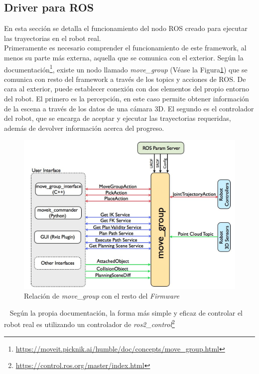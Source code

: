 \subsection{Driver para ROS}
\noindent En esta sección se detalla el funcionamiento del nodo ROS creado para ejecutar las trayectorias en el robot real.
\\


Primeramente es necesario comprender el funcionamiento de este framework, al menos su parte más externa, aquella que 
se comunica con el exterior. 
Según la documentación\footnote{\url{https://moveit.picknik.ai/humble/doc/concepts/move_group.html}}, existe 
un nodo llamado \textit{move\_group} (Véase la Figura\ref{fig:arquitectura_moveit}) que se comunica con resto del framework 
a través de los topics y acciones de ROS. De cara al exterior, puede establecer conexión con dos elementos del propio entorno del robot. 
El primero es la percepción, en este caso permite obtener información de la escena a través de los datos de una cámara 3D. El segundo es el 
controlador del robot, que se encarga de aceptar y ejecutar las trayectorias requeridas, además de devolver información acerca del 
progreso.
\begin{figure} [ht!]
    \begin{center}
      \includegraphics[width=12cm]{figs/moveit_arquitectura.png}
    \end{center}
    \caption{Relación de \textit{move\_group} con el resto del \textit{Firmware}}
    \label{fig:arquitectura_moveit}
\end{figure}\ 
\newpage
Según la propia documentación, la forma más simple y eficaz de controlar el robot real es utilizando un controlador de 
\mbox{\textit{ros2\_control}\footnote{\url{https://control.ros.org/master/index.html}}}
